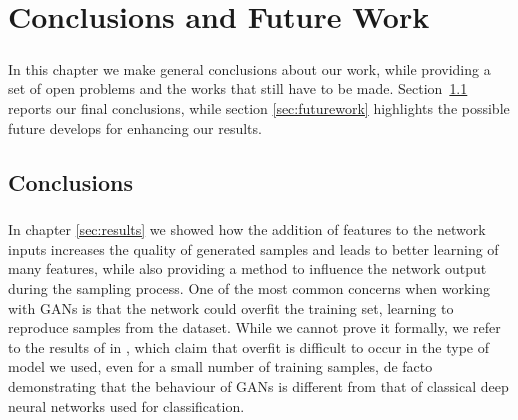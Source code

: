 \chapter{Conclusions and Future Work}
\label{ch:conclusions}
\paragraph{} In this chapter we make general conclusions about our work, while providing a set of open problems and the works that still have to be made. Section~\ref{sec:conclusions} reports our final conclusions, while section \ref{sec:futurework} highlights the possible future develops for enhancing our results.


\section{Conclusions}
\label{sec:conclusions}

\paragraph{} In chapter \ref{sec:results} we showed how the addition of features to the network inputs increases the quality of generated samples and leads to better learning of many features, while also providing a method to influence the network output during the sampling process. One of the most common concerns when working with GANs is that the network could overfit the training set, learning to reproduce samples from the dataset. While we cannot prove it formally, we refer to the results of \citeauthor{empiricalevaluation} in \cite[Appendix~C]{empiricalevaluation}, which claim that overfit is difficult to occur in the type of model we used, even for a small number of training samples, de facto demonstrating that the behaviour of GANs is different from that of classical deep neural networks used for classification.


